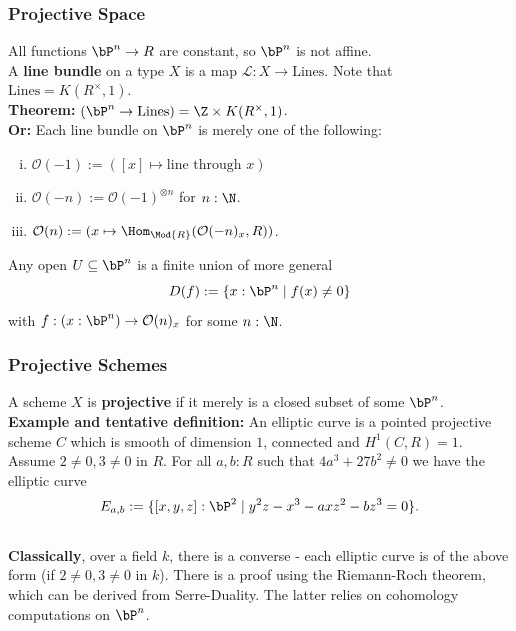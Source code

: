 \documentclass{beamer}
\begin{document}
\begin{frame}
  \frametitle{Projective Space}
  All functions $\bP^n\to R$ are constant, so $\bP^n$ is not affine. \\
  \vspace{4mm}
  \pause
  A \textbf{line bundle} on a type $X$ is a map $\mathcal L:X\to \mathrm{Lines}$.
  Note that $\mathrm{Lines}=K(R^\times,1)$.\\
  \vspace{4mm}
  \pause
  \textbf{Theorem:} $(\bP^n\to \mathrm{Lines}) = \Z\times K(R^\times,1)$. \\
  \pause
  \textbf{Or:} Each line bundle on $\bP^n$ is merely one of the following:
  \begin{enumerate}[(i)]
  \item $\mathcal O(-1):=([x] \mapsto \text{line through $x$})$
  \item $\mathcal O(-n):=\mathcal O(-1)^{\otimes n}$ for $n:\N$.
  \item $\mathcal O(n):=(x\mapsto \Hom_{\Mod{R}}(\mathcal O(-n)_x,R))$.
  \end{enumerate}
  \vspace{4mm}
  \pause
  Any open $U\subseteq \bP^n$ is a finite union of more general
  \[ D(f):=\{x:\bP^n\mid f(x)\neq 0 \}\]
  with $f:(x:\bP^n)\to \mathcal O(n)_x$ for some $n:\N$.
\end{frame}

\begin{frame}
  \frametitle{Projective Schemes}
  \pause
  A scheme $X$ is \textbf{projective} if it merely is a closed subset of some $\bP^n$. \\
  \vspace{4mm}
  \textbf{Example and tentative definition:}
  An elliptic curve is a pointed projective scheme $C$
  which is smooth of dimension $1$, connected and $H^1(C,R)=1$.
  \pause
  Assume $2\neq 0,3\neq 0$ in $R$.
  For all $a,b:R$ such that $4a^3+27b^2\neq 0$ we have the elliptic curve
  \[ E_{a,b}:=\{ [x,y,z] :\bP^2\mid y^2z-x^3-axz^2-bz^3=0 \}.\] \\
  \pause
  \textbf{Classically}, over a field $k$, there is a converse - each elliptic curve is of the above form (if $2\neq 0, 3\neq 0$ in $k$).
  \pause
  There is a proof using the Riemann-Roch theorem, which can be derived from Serre-Duality.
  The latter relies on cohomology computations on $\bP^n$.
\end{frame}
\end{document}
